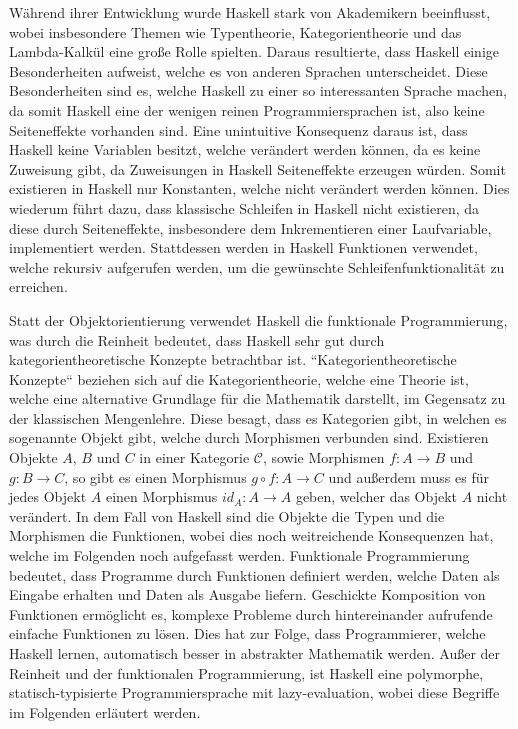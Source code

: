 \documentclass{hhuarticle}
\theoremstyle{definition}
\theoremstyle{theorem}
\begin{document}
  Während ihrer Entwicklung wurde Haskell stark von Akademikern beeinflusst,
  wobei insbesondere Themen wie Typentheorie, Kategorientheorie und das Lambda-Kalkül
  eine große Rolle spielten. Daraus resultierte, dass Haskell
  einige Besonderheiten aufweist, welche es von anderen Sprachen unterscheidet.
  Diese Besonderheiten sind es, welche Haskell zu einer so interessanten
  Sprache machen, da somit Haskell eine der wenigen reinen
  Programmiersprachen ist, also keine Seiteneffekte vorhanden sind.
  Eine unintuitive Konsequenz daraus ist, dass Haskell keine Variablen besitzt,
  welche verändert werden können, da es keine Zuweisung gibt,
  da Zuweisungen in Haskell Seiteneffekte erzeugen würden. Somit
  existieren in Haskell nur Konstanten, welche nicht verändert werden können.
  Dies wiederum führt dazu, dass klassische Schleifen in Haskell nicht existieren,
  da diese durch Seiteneffekte, insbesondere dem Inkrementieren einer
  Laufvariable, implementiert werden. Stattdessen werden in Haskell
  Funktionen verwendet, welche rekursiv aufgerufen werden, um
  die gewünschte Schleifenfunktionalität zu erreichen.

  Statt der Objektorientierung verwendet Haskell die funktionale
  Programmierung, was durch die Reinheit bedeutet, dass Haskell
  sehr gut durch kategorientheoretische Konzepte betrachtbar ist.
  ``Kategorientheoretische Konzepte`` beziehen sich auf die
  Kategorientheorie, welche eine Theorie ist, welche
  eine alternative Grundlage für die Mathematik darstellt, im Gegensatz
  zu der klassischen Mengenlehre.
  Diese besagt, dass es Kategorien gibt, in welchen es sogenannte Objekt
  gibt, welche durch Morphismen verbunden sind. Existieren
  Objekte $A$, $B$ und $C$ in einer Kategorie $\mathcal{C}$,
  sowie Morphismen $f: A \to B$ und $g: B \to C$, so gibt es einen
  Morphismus $g \circ f: A \to C$ und außerdem muss es für jedes
  Objekt $A$ einen Morphismus $id_A: A \to A$ geben, welcher
  das Objekt $A$ nicht verändert. In dem Fall von Haskell sind die
  Objekte die Typen und die Morphismen die Funktionen, wobei dies noch
  weitreichende Konsequenzen hat, welche im Folgenden noch aufgefasst werden.
  Funktionale Programmierung bedeutet, dass Programme durch Funktionen
  definiert werden, welche Daten als Eingabe erhalten und Daten als
  Ausgabe liefern. Geschickte Komposition von Funktionen ermöglicht
  es, komplexe Probleme durch hintereinander aufrufende einfache
  Funktionen zu lösen.
  Dies hat zur Folge, dass Programmierer, welche Haskell lernen,
  automatisch besser in abstrakter Mathematik werden. Außer der Reinheit
  und der funktionalen Programmierung, ist Haskell eine
  polymorphe, statisch-typisierte Programmiersprache mit
  lazy-evaluation, wobei diese Begriffe im Folgenden erläutert werden.
\end{document}
